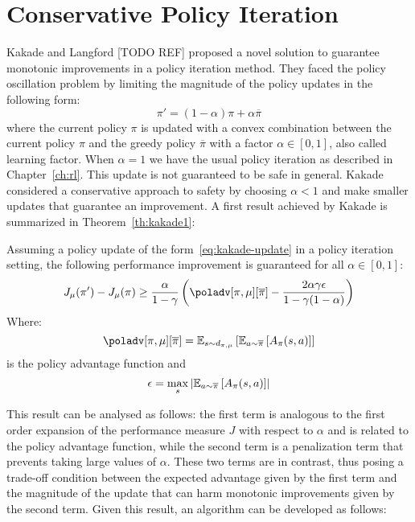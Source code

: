 \section{Conservative Policy Iteration}
\label{sec:cpi}
Kakade and Langford [TODO REF] proposed a novel solution to guarantee monotonic improvements in a policy iteration method. They faced the policy oscillation problem by limiting the magnitude of the policy updates in the following form:
\begin{equation}
\pi' = (1-\alpha )\pi + \alpha\overline{\pi} \label{eq:kakade-update}
\end{equation}
where the current policy $\pi$ is updated with a convex combination between the current policy $\pi$ and the greedy policy $\overline{\pi}$ with a factor $\alpha \in [0,1]$, also called learning factor.
When $\alpha = 1$ we have the usual policy iteration as described in Chapter~\ref{ch:rl}. This update is not guaranteed to be safe in general. Kakade considered a conservative approach to safety by choosing $\alpha < 1$ and make smaller updates that guarantee an improvement.
A first result achieved by Kakade is summarized in Theorem~\ref{th:kakade1}:
\begin{theorem}
\label{th:kakade1}
Assuming a policy update of the form~\ref{eq:kakade-update} in a policy iteration setting, the following performance improvement is guaranteed for all $\alpha \in [0,1]$:
\begin{equation}
J_{\mu}(\pi') - J_{\mu}(\pi) \geq \frac{\alpha}{1 - \gamma}\left( \poladv[\pi, \mu][\overline{\pi}] - \frac{2\alpha \gamma \epsilon}{1 - \gamma (1 - \alpha)} \right) \label{eq:kakade-improvement}
\end{equation}
Where:
\begin{equation}
\poladv[\pi, \mu][\overline{\pi}] = \EV[s\sim d_{\pi, \mu}]{ \EV[a\sim\overline{\pi}]{A_{\pi}(s,a)}}
\end{equation}
is the policy advantage function and
\begin{equation}
\epsilon = \max_s \left| \EV[a\sim\overline{\pi}]{A_{\pi}(s,a)} \right|
\end{equation}
\end{theorem}

This result can be analysed as follows: the first term is analogous to the first order expansion of the performance measure $J$ with respect to $\alpha$ and is related to the policy advantage function, while the second term is a penalization term that prevents taking large values of $\alpha$. These two terms are in contrast, thus posing a trade-off condition between the expected advantage given by the first term and the magnitude of the update that can harm monotonic improvements given by the second term. Given this result, an algorithm can be developed as follows:


